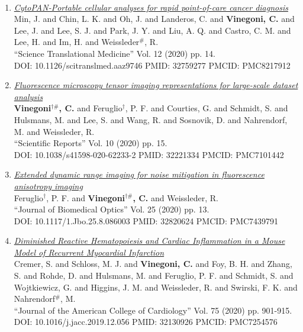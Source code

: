 \documentclass{resume}
\begin{document}
\begin{category}{~~}
\begin{enumerate}
\item \href{https://cvinegoni.github.io/assets/pdf/papers/2020-STM.pdf}{\it  CytoPAN-Portable cellular analyses for rapid point-of-care cancer diagnosis} \\ Min, J. and Chin, L. K. and Oh, J. and Landeros, C. and {\bf Vinegoni, C.} and Lee, J. and Lee, S. J. and Park, J. Y. and Liu, A. Q. and Castro, C. M. and Lee, H. and Im, H. and Weissleder$^\#$, R. \\ ``Science Translational Medicine'' Vol. 12 (2020) pp. 14. \\ DOI: 10.1126/scitranslmed.aaz9746 PMID: 32759277 PMCID: PMC8217912

\item \href{https://cvinegoni.github.io/assets/pdf/papers/2020-SCIREP.pdf}{\it  Fluorescence microscopy tensor imaging representations for large-scale dataset analysis} \\ {\bf Vinegoni$^{\dag \#}$, C.} and Feruglio$^\dag$, P. F. and Courties, G. and Schmidt, S. and Hulsmans, M. and Lee, S. and Wang, R. and Sosnovik, D. and Nahrendorf, M. and Weissleder, R. \\ ``Scientific Reports'' Vol. 10 (2020) pp. 15. \\ DOI: 10.1038/s41598-020-62233-2 PMID: 32221334 PMCID: PMC7101442

\item \href{https://cvinegoni.github.io/assets/pdf/papers/2020-JBO.pdf}{\it  Extended dynamic range imaging for noise mitigation in fluorescence anisotropy imaging} \\ Feruglio$^\dag$, P. F. and {\bf Vinegoni$^{\dag \#}$, C.} and Weissleder, R. \\ ``Journal of Biomedical Optics'' Vol. 25 (2020) pp. 13. \\ DOI: 10.1117/1.Jbo.25.8.086003 PMID: 32820624 PMCID: PMC7439791

\item \href{https://cvinegoni.github.io/assets/pdf/papers/2020-JAMCC.pdf}{\it  Diminished Reactive Hematopoiesis and Cardiac Inflammation in a Mouse Model of Recurrent Myocardial Infarction} \\ Cremer, S. and Schloss, M. J. and {\bf Vinegoni, C.} and Foy, B. H. and Zhang, S. and Rohde, D. and Hulsmans, M. and Feruglio, P. F. and Schmidt, S. and Wojtkiewicz, G. and Higgins, J. M. and Weissleder, R. and Swirski, F. K. and Nahrendorf$^\#$, M. \\ ``Journal of the American College of Cardiology'' Vol. 75 (2020) pp. 901-915. \\ DOI: 10.1016/j.jacc.2019.12.056 PMID: 32130926 PMCID: PMC7254576


\end{enumerate}
\end{category}
\end{document}
